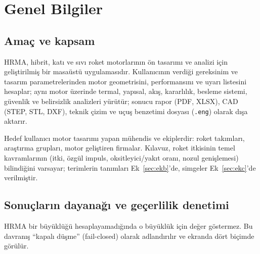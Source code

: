 \documentclass[11pt,a4paper]{article}
\newcommand{\kod}[1]{\texttt{#1}}
\begin{document}
\section{Genel Bilgiler}\label{sec:genel}

\subsection{Amaç ve kapsam}

HRMA, hibrit, katı ve sıvı roket motorlarının ön tasarımı ve analizi için
geliştirilmiş bir masaüstü uygulamasıdır. Kullanıcının verdiği gereksinim ve
tasarım parametrelerinden motor geometrisini, performansını ve uyarı listesini
hesaplar; aynı motor üzerinde termal, yapısal, akış, kararlılık, besleme
sistemi, güvenlik ve belirsizlik analizleri yürütür; sonucu rapor (PDF, XLSX),
CAD (STEP, STL, DXF), teknik çizim ve uçuş benzetimi dosyası (\kod{.eng})
olarak dışa aktarır.

Hedef kullanıcı motor tasarımı yapan mühendis ve ekiplerdir: roket takımları,
araştırma grupları, motor geliştiren firmalar. Kılavuz, roket itkisinin temel
kavramlarının (itki, özgül impuls, oksitleyici/yakıt oranı, nozul genişlemesi)
bilindiğini varsayar; terimlerin tanımları Ek~\ref{sec:ekb}'de, simgeler
Ek~\ref{sec:ekc}'de verilmiştir.

\subsection{Sonuçların dayanağı ve geçerlilik denetimi}\label{sec:ilke}

HRMA bir büyüklüğü hesaplayamadığında o büyüklük için değer göstermez. Bu
davranış ``kapalı düşme'' (fail-closed) olarak adlandırılır ve ekranda dört
biçimde görülür.
\end{document}
